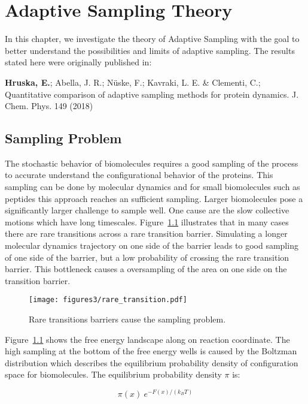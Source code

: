 \afterpage{\null\newpage}
\chapter{Adaptive Sampling Theory\label{ch:chapter3}}


In this chapter, we investigate the theory of Adaptive Sampling with the goal to better understand the possibilities and limits of adaptive sampling. The results stated here were originally published in: 

\cite{Adstrategies2018} \textbf{Hruska, E.}; Abella, J. R.; N\"uske, F.;
Kavraki, L. E. \& Clementi, C.; Quantitative
comparison of adaptive sampling methods
for protein dynamics. J. Chem. Phys. 149 (2018) 

\section{Sampling Problem}

The stochastic behavior of biomolecules requires a good sampling of the process to accurate understand the configurational behavior of the proteins. This sampling can be done by molecular dynamics and for small biomolecules such as peptides this approach reaches an sufficient sampling. Larger biomolecules pose a significantly larger challenge to sample well. One cause are the slow collective motions which have long timescales. Figure~\ref{fig:raretransitions} illustrates that in many cases there are rare transitions across a rare transition barrier. Simulating a longer molecular dynamics trajectory on one side of the barrier leads to good sampling of one side of the barrier, but a low probability of crossing the rare transition barrier. This bottleneck causes a oversampling of the area on one side on the transition barrier.  

\begin{figure}[H]
  \centering
  \texttt{[image: figures3/rare\_transition.pdf]}
  \caption{Rare transitions barriers cause the sampling problem.}
  \label{fig:raretransitions}
\end{figure}

Figure~\ref{fig:raretransitions} shows the free energy landscape along on reaction coordinate. The high sampling at the bottom of the free energy wells is caused by the Boltzman distribution which describes the equilibrium probability density of configuration space for biomolecules. The equilibrium probability density $\pi$ is:

$$\pi(x)~e^{-F(x)/(k_{B}T)}$$

